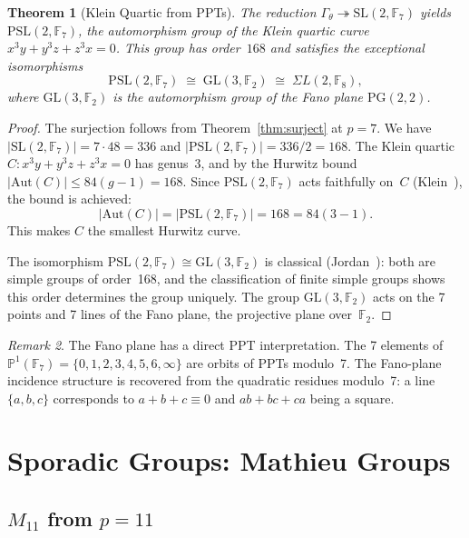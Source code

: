 \documentclass[12pt]{amsart}
\newtheorem{theorem}{Theorem}[section]
\theoremstyle{definition}
\theoremstyle{remark}
\newtheorem{remark}[theorem]{Remark}
\newcommand{\SL}{\mathrm{SL}}
\newcommand{\PSL}{\mathrm{PSL}}
\newcommand{\GL}{\mathrm{GL}}
\newcommand{\Aut}{\mathrm{Aut}}
\newcommand{\PP}{\mathbb{P}}
\newcommand{\Gtheta}{\Gamma_\theta}
\begin{document}
\begin{theorem}[Klein Quartic from PPTs]\label{thm:klein}
The reduction $\Gtheta \twoheadrightarrow \SL(2,\mathbb{F}_7)$ yields
$\PSL(2,\mathbb{F}_7)$, the automorphism group of the Klein quartic
curve $x^3 y + y^3 z + z^3 x = 0$.  This group has order~$168$
and satisfies the exceptional isomorphisms
\[
\PSL(2,\mathbb{F}_7) \;\cong\; \GL(3,\mathbb{F}_2) \;\cong\;
\Sigma L(2,\mathbb{F}_8),
\]
where $\GL(3,\mathbb{F}_2)$ is the automorphism group of the Fano
plane $\mathrm{PG}(2,2)$.
\end{theorem}

\begin{proof}
The surjection follows from Theorem~\ref{thm:surject} at $p = 7$.
We have $|\SL(2,\mathbb{F}_7)| = 7 \cdot 48 = 336$ and
$|\PSL(2,\mathbb{F}_7)| = 336/2 = 168$.  The Klein quartic
$C: x^3 y + y^3 z + z^3 x = 0$ has genus~3, and by the Hurwitz
bound $|\Aut(C)| \le 84(g-1) = 168$.  Since $\PSL(2,\mathbb{F}_7)$
acts faithfully on~$C$ (Klein~\cite{klein}), the bound is achieved:
\[
|\Aut(C)| = |\PSL(2,\mathbb{F}_7)| = 168 = 84(3-1).
\]
This makes $C$ the smallest Hurwitz curve.

The isomorphism $\PSL(2,\mathbb{F}_7) \cong \GL(3,\mathbb{F}_2)$ is
classical (Jordan~\cite{jordan}): both are simple groups of order~168,
and the classification of finite simple groups shows this order
determines the group uniquely.  The group $\GL(3,\mathbb{F}_2)$
acts on the 7 points and 7 lines of the Fano plane, the projective
plane over~$\mathbb{F}_2$.
\end{proof}

\begin{remark}
The Fano plane has a direct PPT interpretation.  The 7 elements of
$\PP^1(\mathbb{F}_7) = \{0,1,2,3,4,5,6,\infty\}$ are orbits of
PPTs modulo~7.  The Fano-plane incidence structure is recovered from
the quadratic residues modulo~7: a line $\{a,b,c\}$ corresponds to
$a + b + c \equiv 0$ and $ab + bc + ca$ being a square.
\end{remark}

\section{Sporadic Groups: Mathieu Groups}\label{sec:sporadic}

\subsection{$M_{11}$ from $p = 11$}
\end{document}
